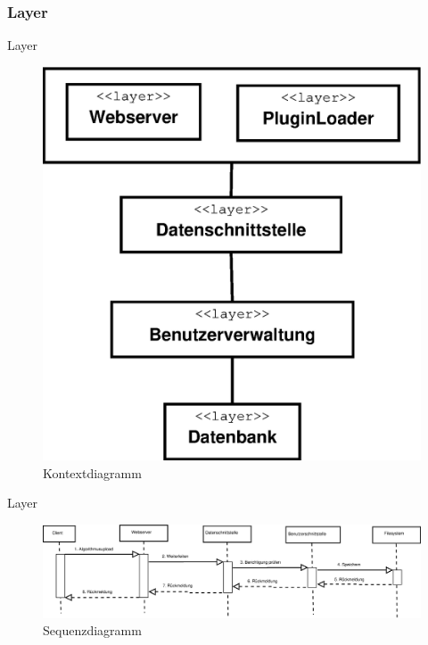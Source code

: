 \documentclass{beamer}
\begin{document}
		\subsubsection{Layer}
		\begin{frame}{Layer}
			\begin{figure}
				\centering
				\includegraphics[height=0.8\textheight]{../Grafik/Diagramm/Layer}
				\caption{Kontextdiagramm}
				\label{fig:Kontext4}
			\end{figure}
		\end{frame}
		\begin{frame}{Layer}	
			\begin{figure}
				\centering
				\includegraphics[width=1\linewidth]{../Grafik/Diagramm/Szenarios/Algorithmus}
				\caption{Sequenzdiagramm}
				\label{fig:Sequenz4}
			\end{figure}
		\end{frame}
		
\end{document}
